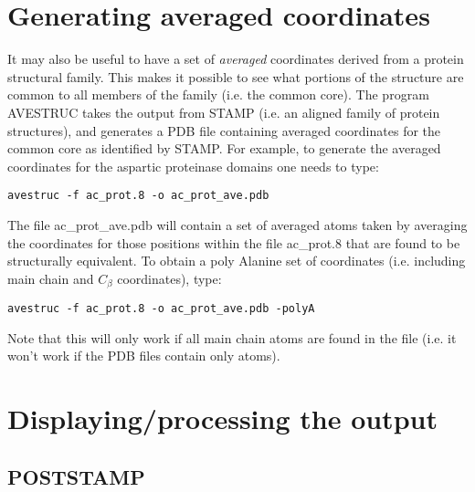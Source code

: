 \section{Generating averaged coordinates}

It may also be useful to have a set of {\em averaged} coordinates derived 
from a protein structural family.  This makes it possible to see what 
portions of the structure are common to all members of the family (i.e. 
the common core).  The program AVESTRUC takes the output from STAMP 
(i.e. an aligned family of protein structures), and generates a PDB file 
containing averaged coordinates for the common core as identified by 
STAMP.  For example, to generate the averaged coordinates for the 
aspartic proteinase domains one needs to type:\\

\begin{scriptsize}\begin{verbatim}
avestruc -f ac_prot.8 -o ac_prot_ave.pdb
\end{verbatim} \end{scriptsize}

The file ac\_prot\_ave.pdb will contain a set of averaged \Cal atoms taken 
by averaging the coordinates for those positions within the file 
ac\_prot.8 that are found to be structurally equivalent.  To obtain a poly 
Alanine set of coordinates (i.e. including main chain and $C_{\beta}$ 
coordinates), type:\\

\begin{scriptsize}\begin{verbatim}
avestruc -f ac_prot.8 -o ac_prot_ave.pdb -polyA
\end{verbatim} \end{scriptsize}

Note that this will only work if all main chain atoms are found in the file
(i.e. it won't work if the PDB files contain only \Cal atoms).

\section{Displaying/processing the output}

\subsection{POSTSTAMP}

